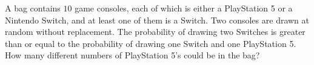 A bag contains $10$ game consoles, each of which is either a PlayStation 5 or a Nintendo Switch, and at least one of them is a Switch. Two consoles are drawn at random without replacement. The probability of drawing two Switches is greater than or equal to the probability of drawing one Switch and one PlayStation 5. How many different numbers of PlayStation 5's could be in the bag?
